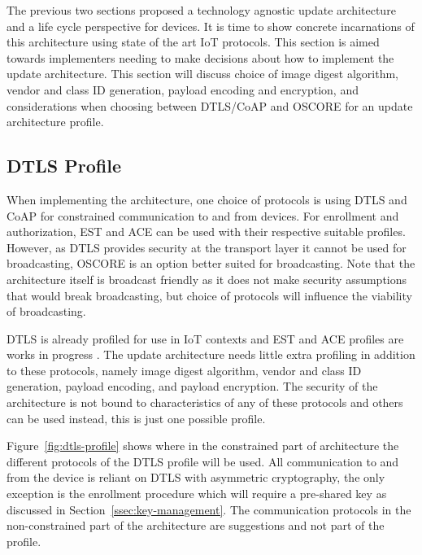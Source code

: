 \documentclass[0-thesis.tex]{subfiles}
\begin{document}
\label{chap:profiles}
The previous two sections proposed a technology agnostic update architecture and a life
cycle perspective for devices. It is time to show concrete incarnations of this
architecture using state of the art IoT protocols. This section is aimed towards
implementers needing to make decisions about how to implement the update architecture.
This section will discuss choice of image digest algorithm, vendor and class ID
generation, payload encoding and encryption, and considerations when choosing between
DTLS/CoAP and OSCORE for an update architecture profile.

\subsection{DTLS Profile}
\label{ssec:dtls-profile}
When implementing the architecture, one choice of protocols is using DTLS and CoAP for
constrained communication to and from devices. For enrollment and authorization, EST and
ACE can be used with their respective suitable profiles. However, as DTLS provides
security at the transport layer it cannot be used for broadcasting, OSCORE is an
option better suited for broadcasting. Note that the architecture itself is broadcast
friendly as it does not make security assumptions that would break broadcasting, but
choice of protocols will influence the viability of broadcasting.

DTLS is already profiled for use in IoT contexts and EST and ACE profiles are works in
progress \parencite{rfc7925, est-coaps, ace-dtls-profile}. The update architecture needs
little extra profiling in addition to these protocols, namely image digest algorithm,
vendor and class ID generation, payload encoding, and payload encryption. The security of
the architecture is not bound to characteristics of any of these protocols and others can
be used instead, this is just one possible profile.

Figure~\ref{fig:dtls-profile} shows where in the constrained part of architecture the
different protocols of the DTLS profile will be used. All communication to and from the
device is reliant on DTLS with asymmetric cryptography, the only exception is the
enrollment procedure which will require a pre-shared key as discussed in
Section~\ref{ssec:key-management}. The communication protocols in the non-constrained part
of the architecture are suggestions and not part of the profile.
\end{document}
